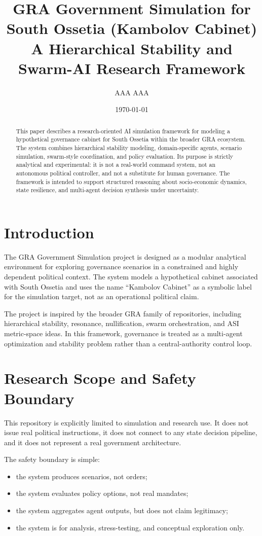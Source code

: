 \documentclass[11pt,a4paper]{article}
\title{\textbf{GRA Government Simulation for South Ossetia (Kambolov Cabinet)}\\
\large A Hierarchical Stability and Swarm-AI Research Framework}
\author{AAA AAA}
\date{\today}
\begin{document}
\maketitle

\begin{abstract}
This paper describes a research-oriented AI simulation framework for modeling a hypothetical governance cabinet for South Ossetia within the broader GRA ecosystem. The system combines hierarchical stability modeling, domain-specific agents, scenario simulation, swarm-style coordination, and policy evaluation. Its purpose is strictly analytical and experimental: it is not a real-world command system, not an autonomous political controller, and not a substitute for human governance. The framework is intended to support structured reasoning about socio-economic dynamics, state resilience, and multi-agent decision synthesis under uncertainty.
\end{abstract}

\section{Introduction}

The GRA Government Simulation project is designed as a modular analytical environment for exploring governance scenarios in a constrained and highly dependent political context. The system models a hypothetical cabinet associated with South Ossetia and uses the name ``Kambolov Cabinet'' as a symbolic label for the simulation target, not as an operational political claim.

The project is inspired by the broader GRA family of repositories, including hierarchical stability, resonance, nullification, swarm orchestration, and ASI metric-space ideas. In this framework, governance is treated as a multi-agent optimization and stability problem rather than a central-authority control loop.

\section{Research Scope and Safety Boundary}

This repository is explicitly limited to simulation and research use. It does not issue real political instructions, it does not connect to any state decision pipeline, and it does not represent a real government architecture.

The safety boundary is simple:

\begin{itemize}[leftmargin=1.5em]
    \item the system produces scenarios, not orders;
    \item the system evaluates policy options, not real mandates;
    \item the system aggregates agent outputs, but does not claim legitimacy;
    \item the system is for analysis, stress-testing, and conceptual exploration only.
\end{itemize}
\end{document}
